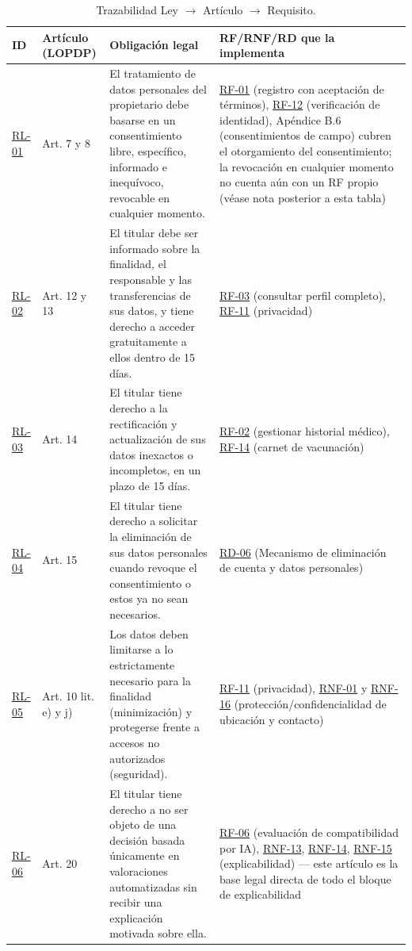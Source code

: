 \documentclass[journal,onecolumn]{IEEEtran}
\begin{document}
	\begin{table}[H]
		\centering
		\caption{Trazabilidad Ley $\rightarrow$ Artículo $\rightarrow$ Requisito.}
		\label{tab:legales}
		\small
		\begin{tabularx}{\textwidth}{@{}p{1.1cm} p{1.9cm} p{5.4cm} X@{}}
			\toprule
			\textbf{ID} & \textbf{Artículo (LOPDP)} & \textbf{Obligación legal} & \textbf{RF/RNF/RD que la implementa} \\
			\midrule
			\hyperref[rl:01]{RL-01}\label{rl:01} & Art. 7 y 8 & El tratamiento de datos personales del propietario debe basarse en un consentimiento libre, específico, informado e inequívoco, revocable en cualquier momento. & \hyperref[tab:RF-01]{RF-01} (registro con aceptación de términos), \hyperref[tab:RF-12]{RF-12} (verificación de identidad), Apéndice B.6 (consentimientos de campo) cubren el otorgamiento del consentimiento; la revocación en cualquier momento no cuenta aún con un RF propio (véase nota posterior a esta tabla) \\
			\addlinespace
			\hyperref[rl:02]{RL-02}\label{rl:02} & Art. 12 y 13 & El titular debe ser informado sobre la finalidad, el responsable y las transferencias de sus datos, y tiene derecho a acceder gratuitamente a ellos dentro de 15 días. & \hyperref[tab:RF-03]{RF-03} (consultar perfil completo), \hyperref[tab:RF-11]{RF-11} (privacidad) \\
			\addlinespace
			\hyperref[rl:03]{RL-03}\label{rl:03} & Art. 14 & El titular tiene derecho a la rectificación y actualización de sus datos inexactos o incompletos, en un plazo de 15 días. & \hyperref[tab:RF-02]{RF-02} (gestionar historial médico), \hyperref[tab:RF-14]{RF-14} (carnet de vacunación) \\
			\addlinespace
			\hyperref[rl:04]{RL-04}\label{rl:04} & Art. 15 & El titular tiene derecho a solicitar la eliminación de sus datos personales cuando revoque el consentimiento o estos ya no sean necesarios. & \hyperref[tab:RD-06]{RD-06} (Mecanismo de eliminación de cuenta y datos personales) \\
			\addlinespace
			\hyperref[rl:05]{RL-05}\label{rl:05} & Art. 10 lit. e) y j) & Los datos deben limitarse a lo estrictamente necesario para la finalidad (minimización) y protegerse frente a accesos no autorizados (seguridad). & \hyperref[tab:RF-11]{RF-11} (privacidad), \hyperref[tab:RNF-01]{RNF-01} y \hyperref[tab:RNF-16]{RNF-16} (protección/confidencialidad de ubicación y contacto) \\
			\addlinespace
			\hyperref[rl:06]{RL-06}\label{rl:06} & Art. 20 & El titular tiene derecho a no ser objeto de una decisión basada únicamente en valoraciones automatizadas sin recibir una explicación motivada sobre ella. & \hyperref[tab:RF-06]{RF-06} (evaluación de compatibilidad por IA), \hyperref[tab:RNF-13]{RNF-13}, \hyperref[tab:RNF-14]{RNF-14}, \hyperref[tab:RNF-15]{RNF-15} (explicabilidad) --- este artículo es la base legal directa de todo el bloque de explicabilidad \\

\end{tabularx}
\end{table}
\end{document}
